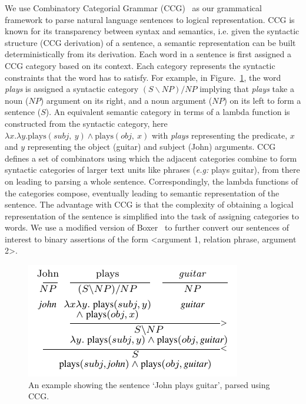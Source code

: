 \documentclass{llncs}
\begin{document}
We use Combinatory Categorial Grammar (CCG)~\cite{Steedman:2000:SP:332037} as our grammatical framework to parse natural language sentences to logical representation. CCG is known for its transparency between syntax and semantics, i.e. given the syntactic structure (CCG derivation) of a sentence, a semantic representation can be built deterministically from its derivation. Each word in a sentence is first assigned a CCG category based on its context. Each category represents the syntactic constraints that the word has to satisfy. For example, in Figure.~\ref{fig:ccg_sample}, the word \textit{plays} is assigned a syntactic category $(S\backslash NP)/NP$ implying that \textit{plays} take a noun ($NP$) argument on its right, and a noun argument ($NP$) on its left to form a sentence ($S$). An equivalent semantic category in terms of a lambda function is constructed from the syntactic category, here $\lambda x. \lambda y. \mathrm{plays}(subj,~y) \wedge \mathrm{plays}(obj,~x)$ with \textit{plays} representing the predicate, $x$ and $y$ representing the object (guitar) and subject (John) arguments. CCG defines a set of combinators using which the adjacent categories combine to form syntactic categories of larger text units like phrases (\textit{e.g:} plays guitar), from there on leading to parsing a whole sentence. Correspondingly, the lambda functions of the categories compose, eventually leading to semantic representation of the sentence. The advantage with CCG is that the complexity of obtaining a logical representation of the sentence is simplified into the task of assigning categories to words. We use a modified version of Boxer~\cite{Bos2004} to further convert our sentences of interest to binary assertions of the form <argument 1, relation phrase, argument 2>.
\begin{figure}[!t]
\centering
\includegraphics[width=0.6\linewidth]{figures/ccg_sample.pdf}
\caption{An example showing the sentence `John plays guitar', parsed using CCG.}
\label{fig:ccg_sample}
\end{figure}
\end{document}
